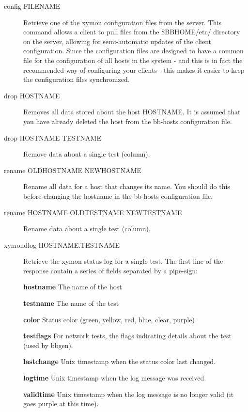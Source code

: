 \begin{description}
 

\item[config FILENAME] Retrieve one of the xymon configuration files
  from the server. This command allows a client to pull files from the
  \$BBHOME/etc/ directory on the server, allowing for semi-automatic
  updates of the client configuration. Since the configuration files
  are designed to have a common file for the configuration of all
  hosts in the system - and this is in fact the recommended way of
  configuring your clients - this makes it easier to keep the
  configuration files synchronized. 


 

\item[drop HOSTNAME] Removes all data stored about the host
  HOSTNAME. It is assumed that you have already deleted the host from
  the bb-hosts configuration file. 


 

\item[drop HOSTNAME TESTNAME] Remove data about a single test (column). 

 

\item[rename OLDHOSTNAME NEWHOSTNAME] Rename all data for a host that
  changes its name. You should do this before changing the hostname in
  the bb-hosts configuration file. 


 

\item[rename HOSTNAME OLDTESTNAME NEWTESTNAME] Rename data about a single test (column). 

 

\item[xymondlog HOSTNAME.TESTNAME] Retrieve the xymon status-log for
  a single test. The first line of the response contain a series of
  fields separated by a pipe-sign: 


 \textbf{hostname}
 The name of the host 


 \textbf{testname}
 The name of the test 


 \textbf{color}
 Status color (green, yellow, red, blue, clear, purple) 


 \textbf{testflags}
 For network tests, the flags indicating details about the test (used by bbgen). 


 \textbf{lastchange}
 Unix timestamp when the status color last changed. 


 \textbf{logtime}
 Unix timestamp when the log message was received. 


 \textbf{validtime}
 Unix timestamp when the log message is no longer valid (it goes purple at this time). 



\end{description}

